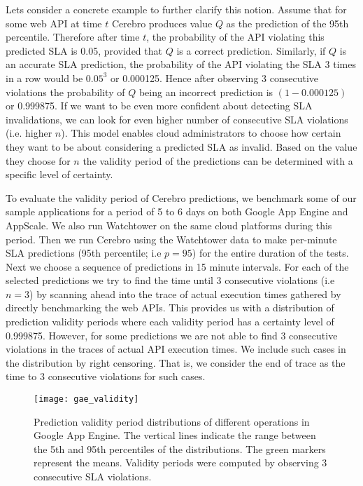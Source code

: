Lets consider a concrete example to further clarify this notion. Assume that for some web API at time $t$ Cerebro produces value $Q$ as the 
prediction of the 95th percentile. Therefore after time $t$, the probability of the API violating this predicted SLA is 0.05, provided
that $Q$ is a correct prediction. Similarly, if $Q$ is an accurate SLA prediction, the probability of the API
violating the SLA 3 times in a row would be $0.05^3$ or 0.000125. Hence after observing 3 consecutive violations the probability of $Q$
being an incorrect prediction is $(1 - 0.000125)$ or 0.999875. If we want to be even more confident about detecting SLA invalidations, 
we can look for even higher
number of consecutive SLA violations (i.e. higher $n$). This model enables cloud administrators to choose how certain they want to be about
considering a predicted SLA as invalid. Based on the value they choose for $n$ the validity period of the predictions can be determined
with a specific level of certainty.

To evaluate the validity period of Cerebro predictions, we benchmark some of our sample applications for a period of 5 to 6 days on both
Google App Engine and AppScale. We also run Watchtower on the same cloud platforms during this period. Then we run Cerebro using
the Watchtower data to make per-minute SLA predictions (95th percentile; i.e $p=95$) for the entire duration of the tests. Next we choose a sequence of predictions
in 15 minute intervals. For each of the selected predictions we try to find the time until 3 consecutive violations (i.e $n=3$) by scanning ahead into the trace of
actual execution times gathered by directly benchmarking the web APIs. This provides us with a distribution of prediction validity periods where
each validity period has a certainty level of 0.999875.
However, for some predictions we are not able to find 3 consecutive violations in the traces of actual API execution times. We include
such cases in the distribution by right censoring. That is, we consider the end of trace as the time to 3 consecutive violations for such cases.

\begin{figure}
\centering
\texttt{[image: gae\_validity]}
\caption{Prediction validity period distributions of different operations in Google App Engine. The vertical lines indicate the range between the 5th and 95th percentiles of the distributions. The green markers represent the means. Validity periods were computed by observing 3 consecutive SLA
violations.}
\label{fig:gae_validity}
\end{figure}

